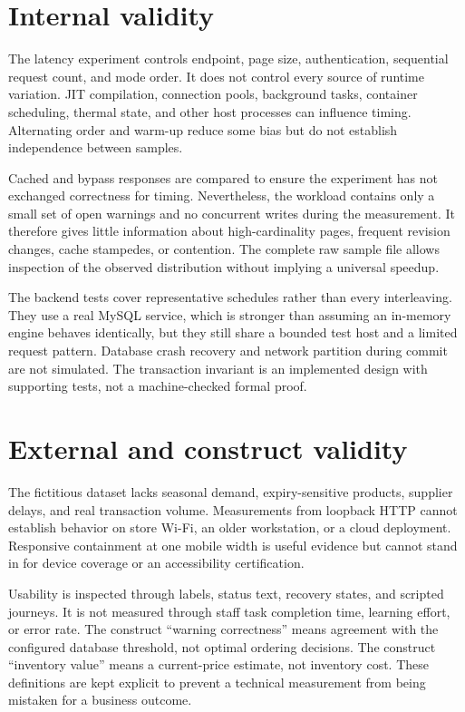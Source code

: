 \section{Internal validity}
The latency experiment controls endpoint, page size, authentication, sequential request count, and mode order. It does not control every source of runtime variation. JIT compilation, connection pools, background tasks, container scheduling, thermal state, and other host processes can influence timing. Alternating order and warm-up reduce some bias but do not establish independence between samples.

Cached and bypass responses are compared to ensure the experiment has not exchanged correctness for timing. Nevertheless, the workload contains only a small set of open warnings and no concurrent writes during the measurement. It therefore gives little information about high-cardinality pages, frequent revision changes, cache stampedes, or contention. The complete raw sample file allows inspection of the observed distribution without implying a universal speedup.

The backend tests cover representative schedules rather than every interleaving. They use a real MySQL service, which is stronger than assuming an in-memory engine behaves identically, but they still share a bounded test host and a limited request pattern. Database crash recovery and network partition during commit are not simulated. The transaction invariant is an implemented design with supporting tests, not a machine-checked formal proof.

\section{External and construct validity}
The fictitious dataset lacks seasonal demand, expiry-sensitive products, supplier delays, and real transaction volume. Measurements from loopback HTTP cannot establish behavior on store Wi-Fi, an older workstation, or a cloud deployment. Responsive containment at one mobile width is useful evidence but cannot stand in for device coverage or an accessibility certification.

Usability is inspected through labels, status text, recovery states, and scripted journeys. It is not measured through staff task completion time, learning effort, or error rate. The construct ``warning correctness'' means agreement with the configured database threshold, not optimal ordering decisions. The construct ``inventory value'' means a current-price estimate, not inventory cost. These definitions are kept explicit to prevent a technical measurement from being mistaken for a business outcome.


